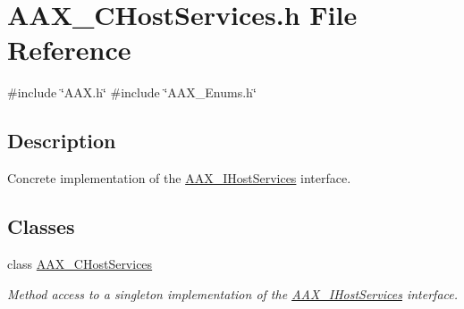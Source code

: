 \hypertarget{a00434}{}\section{A\+A\+X\+\_\+\+C\+Host\+Services.\+h File Reference}
\label{a00434}
{\ttfamily \#include \char`\"{}A\+A\+X.\+h\char`\"{}}\newline
{\ttfamily \#include \char`\"{}A\+A\+X\+\_\+\+Enums.\+h\char`\"{}}\newline


\subsection{Description}
Concrete implementation of the \mbox{\hyperlink{a01841}{A\+A\+X\+\_\+\+I\+Host\+Services}} interface. 

\subsection*{Classes}
\begin{DoxyCompactItemize}
\item 
class \mbox{\hyperlink{a01489}{A\+A\+X\+\_\+\+C\+Host\+Services}}
\begin{DoxyCompactList}\small\item\em Method access to a singleton implementation of the \mbox{\hyperlink{a01841}{A\+A\+X\+\_\+\+I\+Host\+Services}} interface. \end{DoxyCompactList}\end{DoxyCompactItemize}

